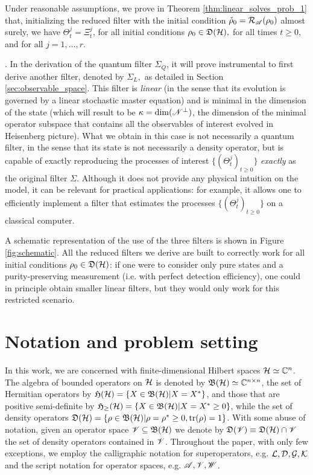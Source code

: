 \documentclass[aihp,12pt]{imsart}
\begin{document}
Under reasonable assumptions, we prove in Theorem \ref{thm:linear_solves_prob_1} that, initializing the reduced filter with the initial condition $\check{\rho}_0=\mathcal{R}_{\mathscr{A}}(\rho_0)$ almost surely,  we have $\Theta_t^j = \Xi_t^j$, for all initial conditions $\rho_0\in\mathfrak{D}(\mathcal{H}),$ for all times $t\geq0,$ and for all $j=1,\dots,r$. 
\bigskip

.
In the derivation of the quantum filter $\Sigma_Q$, it will prove instrumental to first derive  another filter, denoted by $\Sigma_L,$ as detailed in Section \ref{sec:observable_space}. This filter is {\em linear} (in the sense that its evolution is governed by a linear stochastic master equation) and is minimal in the dimension of the state (which will result to be $\kappa=\dim(\mathscr{N}^\perp)$, the dimension of the minimal operator subspace that contains all the observables of interest evolved in Heisenberg picture). What we obtain in this case is not necessarily a quantum filter, in the sense that its state is not necessarily a density operator, but is capable of exactly reproducing the processes of interest $\{(\Theta_t^j)_{t\geq0}\}$ {\em exactly} as the original filter $\Sigma$.
Although it does not provide any physical intuition on the model, it can be relevant for practical applications: for example, it allows one to efficiently implement a filter that estimates the processes $\{(\Theta_t^j)_{t\geq0}\}$ on a classical computer.
\bigskip


A schematic representation of the use of the three filters is shown in Figure \ref{fig:schematic}. All the reduced filters we derive are built to correctly work for all initial conditions $\rho_0\in\mathfrak{D}(\mathcal{H})$: if one were to consider only pure states and a purity-preserving measurement (i.e. with perfect detection efficiency), one could in principle obtain smaller linear filters, but they would only work for this restricted scenario. 


\section{Notation and problem setting}
\label{sec:problem_setting}

In this work, we are concerned with finite-dimensional Hilbert spaces $\mathcal{H}\simeq\mathbb{C}^{n}$. The algebra of bounded operators on $\mathcal{H}$ is denoted by $\mathfrak{B}(\mathcal{H})\simeq\mathbb{C}^{n\times n}$, the set of Hermitian operators by $\mathfrak{H}(\mathcal{H}) = \{X\in\mathfrak{B}(\mathcal{H})|X=X^*\}$, and those that are positive semi-definite by $\mathfrak{H}_{\geq}(\mathcal{H})=\{X \in\mathfrak{B}(\mathcal{H})|X=X^* \geq0\}$, while the set of density operators $\mathfrak{D}(\mathcal{H})=\{\rho\in\mathfrak{B}(\mathcal{H})|\rho=\rho^*\geq0, {\rm tr}(\rho)=1\}$. 
With some abuse of notation, given an operator space $\mathscr{V}\subseteq\mathfrak{B}(\mathcal{H})$ we denote by $\mathfrak{D}(\mathscr{V}) \equiv \mathfrak{D}(\mathcal{H}) \cap \mathscr{V}$ the set of density operators contained in $\mathscr{V}$.
Throughout the paper, with only few exceptions, we employ the calligraphic notation for superoperators, e.g. $\mathcal{L},\mathcal{D},\mathcal{G},\mathcal{K}$ and the script notation for operator spaces, e.g. $\mathscr{A},\mathscr{V},\mathscr{W}$. 
\end{document}
